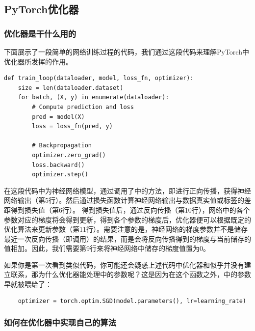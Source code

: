 \subsection{PyTorch优化器}

\subsubsection{优化器是干什么用的}

下面展示了一段简单的网络训练过程的代码，我们通过这段代码来理解PyTorch中优化器所发挥的作用。

\begin{lstlisting}
def train_loop(dataloader, model, loss_fn, optimizer):
    size = len(dataloader.dataset)
    for batch, (X, y) in enumerate(dataloader):
        # Compute prediction and loss
        pred = model(X)
        loss = loss_fn(pred, y)
        
        # Backpropagation
        optimizer.zero_grad()
        loss.backward()
        optimizer.step()
\end{lstlisting}
    
在这段代码中为神经网络模型，通过调用了中的方法，即进行正向传播，获得神经网络输出（第5行）。然后通过损失函数计算神经网络输出与数据真实值或标签的差距得到损失值（第6行）。
得到损失值后，通过反向传播（第10行），网络中的各个参数对应的梯度将会得到更新，得到各个参数的梯度后，优化器便可以根据既定的优化算法来更新参数（第11行）。需要注意的是，神经网络的梯度参数并不是储存最近一次反向传播（即调用）的结果，而是会将反向传播得到的梯度与当前储存的值相加。因此，我们需要第9行来将神经网络中储存的梯度值置为0。

如果你是第一次看到类似代码，你可能还会疑惑上述代码中优化器和似乎并没有建立联系，那为什么优化器能处理中的参数呢？这是因为在这个函数之外，中的参数早就被喂给了：
\begin{lstlisting}
    optimizer = torch.optim.SGD(model.parameters(), lr=learning_rate)
\end{lstlisting}

\subsubsection{如何在优化器中实现自己的算法}

